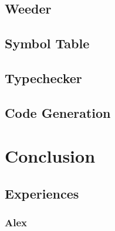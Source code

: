 \documentclass{article}
\begin{document}

\subsection{Weeder}



\subsection{Symbol Table}


\subsection{Typechecker}


\subsection{Code Generation}


\section{Conclusion}



\subsection{Experiences}

\subsubsection{Alex}

\end{document}
